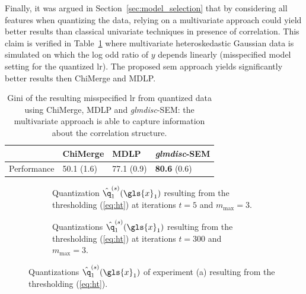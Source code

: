 Finally, it was argued in Section~\ref{sec:model_selection} that by considering all features when quantizing the data, relying on a multivariate approach could yield better results than classical univariate techniques in presence of correlation. This claim is verified in Table~\ref{tab:sim_false} where multivariate heteroskedastic Gaussian data is simulated on which the log odd ratio of $y$ depends linearly (misspecified model setting for the quantized \gls{lr}). The proposed \gls{sem} approach yields significantly better results then ChiMerge and MDLP.

\begin{table}[ht]
    \centering
    \caption{Gini of the resulting misspecified \gls{lr} from quantized data using ChiMerge, MDLP and \textit{glmdisc}-SEM: the multivariate approach is able to capture information about the correlation structure.}
    \label{tab:sim_false}
\begin{tabular}{llll}
 & ChiMerge & MDLP & \textit{glmdisc}-SEM \\
\hline
Performance & 50.1 (1.6) & 77.1 (0.9) & \textbf{80.6} (0.6)
\end{tabular}
\end{table}



 \newlength\figureheight
 \newlength\figurewidth
 \setlength\figureheight{4cm}
 \setlength\figurewidth{14cm}
 
  \begin{figure}[!ht]
    \centering
    \begin{subfigure}[t]{\textwidth}
        \centering
        
        \vspace{-0.5cm}
        \caption{\label{fig:MAP1} Quantization $\hat{\q}^{(s)}_1(\gls{x}_1)$ resulting from the thresholding (\ref{eq:ht}) at iterations $t = 5$ and $m_{\text{max}} = 3$.}
    \end{subfigure}%
    
    \begin{subfigure}[t]{\textwidth}
        \centering
        
        \vspace{-0.5cm}
        \caption{Quantizations $\hat{\q}^{(s)}_1(\gls{x}_1)$ resulting from the thresholding (\ref{eq:ht}) at iterations $t = 300$ and $m_{\text{max}} = 3$.}
    \end{subfigure}
    
    \caption{\label{fig:MAP} Quantizations $\hat{\q}^{(s)}_1(\gls{x}_1)$ of experiment (a) resulting from the thresholding (\ref{eq:ht}).}
\end{figure}

